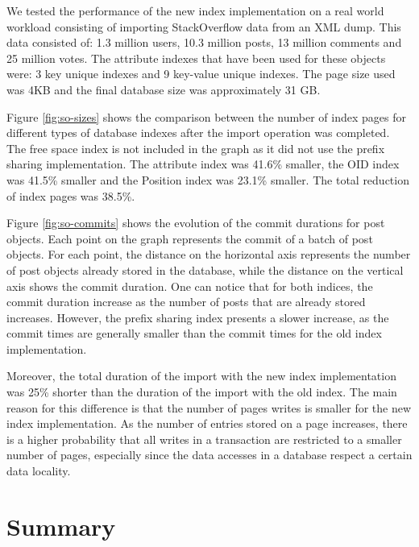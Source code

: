 \documentclass[11pt,a4paper,oneside]{article}
\begin{document}
We tested the performance of the new index implementation on a real world workload consisting of importing StackOverflow data from an XML dump. This data consisted of: 1.3 million users, 10.3 million posts, 13 million comments and 25 million votes. The attribute indexes that have been used for these objects were: 3 key unique indexes and 9 key-value unique indexes. The page size used was 4KB and the final database size was approximately 31 GB. 

Figure \ref{fig:so-sizes} shows the comparison between the number of index pages for different types of database indexes after the import operation was completed. The free space index is not included in the graph as it did not use the prefix sharing implementation. The attribute index was 41.6\% smaller, the OID index was 41.5\% smaller and the Position index was 23.1\% smaller. The total reduction of index pages was 38.5\%. 

Figure \ref{fig:so-commits} shows the evolution of the commit durations for post objects. Each point on the graph represents the commit of a batch of post objects. For each point, the distance on the horizontal axis represents the number of post objects already stored in the database, while the distance on the vertical axis shows the commit duration. One can notice that for both indices, the commit duration increase as the number of posts that are already stored increases. However, the prefix sharing index presents a slower increase, as the commit times are generally smaller than the commit times for the old index implementation. 

Moreover, the total duration of the import with the new index implementation was 25\% shorter than the duration of the import with the old index. The main reason for this difference is that the number of pages writes is smaller for the new index implementation. As the number of entries stored on a page increases, there is a higher probability that all writes in a transaction are restricted to a smaller number of pages, especially since the data accesses in a database respect a certain data locality.

\section{Summary} %
\label{sec:summary}
\end{document}
